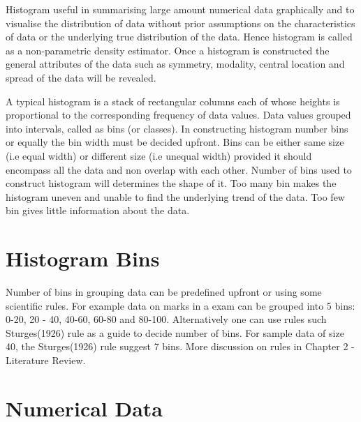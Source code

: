 Histogram useful in summarising large amount numerical data graphically \cite[]{kirschenmann2015note} and to visualise the distribution of data without prior assumptions on the characteristics of data or the underlying true distribution of the data. Hence histogram is called as a non-parametric density estimator\cite[]{keen2010graphics}. Once a histogram is constructed the general attributes of the data such as symmetry, modality, central location and spread of the data will be revealed.

A typical histogram is a stack of rectangular columns each of whose heights is proportional to the corresponding frequency of data values. Data values grouped into intervals, called as bins (or classes). In constructing histogram number bins or equally the bin width must be decided upfront. Bins can be either same size (i.e equal width) or different size (i.e unequal width) provided it should encompass all the data and non overlap with each other. Number of bins used to construct histogram will determines the shape of it. Too many bin makes the histogram uneven and unable to find the underlying trend of the data. Too few bin gives little information about the data. 

\section{Histogram Bins}

Number of bins in grouping data can be predefined upfront or using some scientific rules. For example data on marks in a exam can be grouped into 5 bins: 0-20, 20 - 40, 40-60, 60-80 and 80-100. Alternatively one can use rules such Sturges(1926) rule as a guide to decide number of bins. For sample data of size 40, the Sturges(1926) rule suggest 7 bins. More discussion on rules in Chapter 2 - Literature Review.



\section{Numerical Data }

